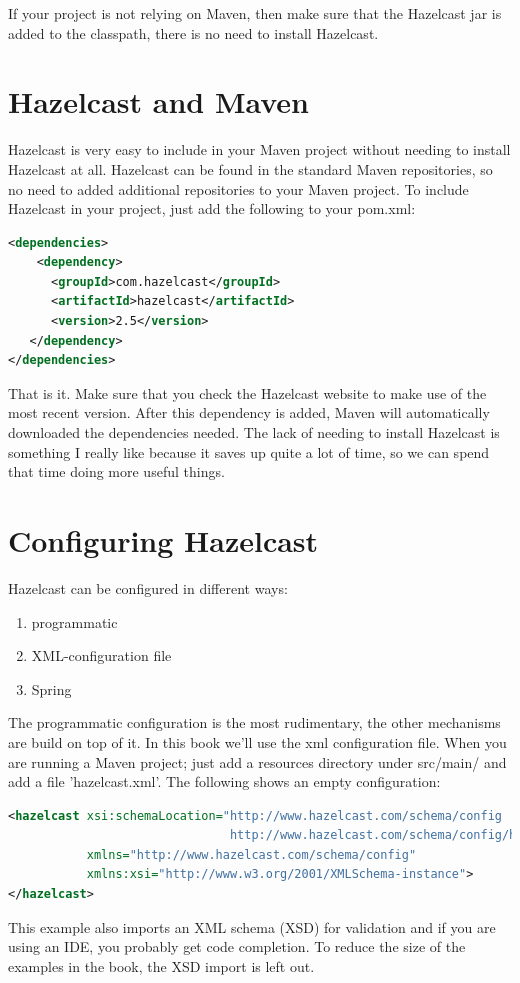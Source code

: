 If your project is not relying on Maven, then make sure that the Hazelcast jar is added to the classpath, there is no need to install Hazelcast.

\section{Hazelcast and Maven}
Hazelcast is very easy to include in your Maven project without needing to install Hazelcast at all. Hazelcast can be found in the standard Maven repositories, so no need to added additional repositories to your Maven project. To include Hazelcast in your project, just add the following to your pom.xml:
\begin{lstlisting}[language=xml]
<dependencies>	
    <dependency>
      <groupId>com.hazelcast</groupId>
      <artifactId>hazelcast</artifactId>
      <version>2.5</version>
   </dependency>
</dependencies>
\end{lstlisting}
That is it. Make sure that you check the Hazelcast website to make use of the most recent version. After this dependency is added, Maven will automatically downloaded the dependencies needed. The lack of needing to install Hazelcast is something I really like because it saves up quite a lot of time, so we can spend that time doing more useful things.

\section{Configuring Hazelcast}
Hazelcast can be configured in different ways:
\begin{enumerate}
\item programmatic
\item XML-configuration file
\item Spring
\end{enumerate}
The programmatic configuration is the most rudimentary, the other mechanisms are build on top of it. In this book we'll use the xml configuration file. When you are running a Maven project; just add a resources directory under src/main/ and add a file 'hazelcast.xml'. The following shows an empty configuration:
\begin{lstlisting}[language=xml]
<hazelcast xsi:schemaLocation="http://www.hazelcast.com/schema/config
                               http://www.hazelcast.com/schema/config/hazelcast-config-2.5.xsd"
           xmlns="http://www.hazelcast.com/schema/config"
           xmlns:xsi="http://www.w3.org/2001/XMLSchema-instance">
</hazelcast>
\end{lstlisting}
This example also imports an XML schema (XSD) for validation and if you are using an IDE, you probably get code completion. To reduce the size of the examples in the book, the XSD import is left out.

